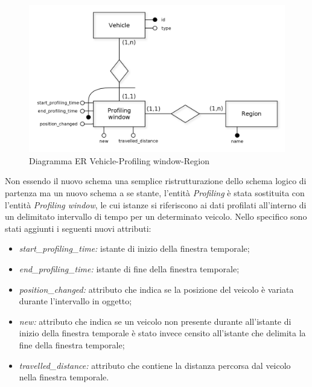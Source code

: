 \begin{figure}[H]                                                                                                                                                            
\centering                                                                                                                                                                   
\includegraphics[width=\textwidth]{diagrams/vehicle_interval_profiling_er}                                                                                                                                   
\caption{Diagramma ER Vehicle-Profiling window-Region}                                                                                                                                            
\label{fig:vehicle_interval_profiling_er}                                                                                                                                                           
\end{figure}

Non essendo il nuovo schema una semplice ristrutturazione dello
schema logico di partenza ma un nuovo schema a se stante, l'entità
\textit{Profiling} è stata sostituita con l'entità \textit{Profiling
window}, le cui istanze si riferiscono ai dati profilati all'interno di
un delimitato intervallo di tempo per un determinato veicolo.
Nello specifico sono stati aggiunti i seguenti nuovi attributi:
\begin{itemize}
\item \textit{start\_profiling\_time:} istante di inizio della finestra
temporale;
\item \textit{end\_profiling\_time:} istante di fine della finestra temporale;
\item \textit{position\_changed:} attributo che indica se la posizione
del veicolo è variata durante l'intervallo in oggetto;
\item \textit{new:} attributo che indica se un veicolo non presente durante
all'istante di inizio della finestra temporale è stato invece censito
all'istante che delimita la fine della finestra temporale;
\item \textit{travelled\_distance:} attributo che contiene la distanza 
percorsa dal veicolo nella finestra temporale.
\end{itemize}

